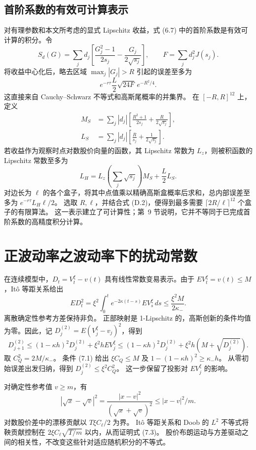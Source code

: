 \subsection{首阶系数的有效可计算表示}

对有理参数和本文所考虑的显式 Lipschitz 收益，式 (6.7) 中的首阶系数是有效可计算的积分。令
\[
S_d(G)=\sum_jd_j\left[\frac{G_j^2-1}{2s_j}-\frac{G_j}{2\sqrt{s_j}}\right],
\qquad F=\sum_jd_j^2J(s_j).
\]
将收益中心化后，略去区域 \(\max_j|G_j|>R\) 引起的误差至多为
\[
e^{-r\tau}\frac L2\sqrt{24F}\,e^{-R^2/4}.
\tag{D.2}
\]
这直接来自 Cauchy--Schwarz 不等式和高斯尾概率的并集界。
在 \([-R,R]^{12}\) 上，定义
\[
\begin{aligned}
M_S&=\sum_j|d_j|\left[\frac{R^2+1}{2s_j}+\frac R{2\sqrt{s_j}}\right],\\
L_S&=\sum_j|d_j|\left[\frac R{s_j}+\frac1{2\sqrt{s_j}}\right].
\end{aligned}
\]
若收益作为观察时点对数股价向量的函数，其 Lipschitz 常数为 \(L_z\)，则被积函数的 Lipschitz 常数至多为
\[
L_H=L_z\left(\sum_j\sqrt{s_j}\right)M_S+\frac L2L_S.
\]
对边长为 \(\ell\) 的各个盒子，将其中点值乘以精确高斯盒概率后求和，总内部误差至多为
\(e^{-r\tau}L_H\ell/2\)。
选取 \(R,\ell\)，并结合式 (D.2)，便得到最多需要
\(\lceil2R/\ell\rceil^{12}\) 个盒子的有限算法。
这一表示建立了可计算性；第~9 节说明，它并不等同于已完成首阶系数的高精度积分计算。

\section{正波动率之波动率下的扰动常数}

在连续模型中，\(D_t=V_t^\xi-v(t)\) 具有线性常数变易表示。由于 \(EV_t^\xi=v(t)\le M\)，It\^o 等距关系给出
\[
ED_t^2=\xi^2\int_0^te^{-2\kappa(t-s)}EV_s^\xi\,ds
\le\frac{\xi^2M}{2\kappa_-}.
\tag{E.1}
\]
离散确定性参考方差保持非负。
正部映射是 1-Lipschitz 的，高斯创新的条件均值为零。因此，记 \(D_j^{(2)}=E(V_j^\xi-v_j)^2\)，得到
\[
D_{j+1}^{(2)}
\le(1-\kappa h)^2D_j^{(2)}+\xi^2hEV_j^\xi
\le(1-\kappa h)^2D_j^{(2)}
+\xi^2h(M+\sqrt{D_j^{(2)}}).
\tag{E.2}
\]
取 \(C_Q^2=2M/\kappa_-\)。
条件 (7.1) 给出 \(\xi C_Q\le M\) 及
\(1-(1-\kappa h)^2\ge\kappa_-h\)。
从零初始误差出发归纳，得到
\(D_j^{(2)}\le\xi^2C_Q^2\)。
这一步保留了投影对 \(EV_j^\xi\) 的影响。

对确定性参考值 \(v\ge m\)，有
\[
|\sqrt{x}-\sqrt v|^2
=\frac{|x-v|^2}{(\sqrt x+\sqrt v)^2}\le |x-v|^2/m.
\]
对数股价差中的漂移贡献以 \(T\xi C_\ell/2\) 为界。
It\^o 等距关系和 Doob 的 \(L^2\) 不等式将鞅贡献控制在
\(2\xi C_\ell\sqrt{T/m}\) 以内，从而证明式 (7.3)。
股价布朗运动与方差驱动之间的相关性，不改变这些针对适应随机积分的不等式。

